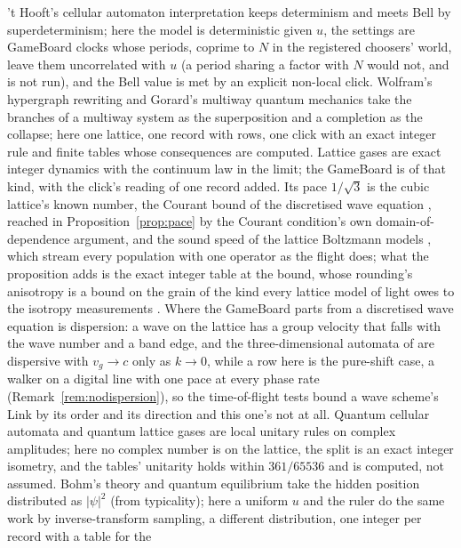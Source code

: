 \documentclass[11pt]{article}
\theoremstyle{definition}
\begin{document}
't Hooft's cellular automaton interpretation \cite{thooft2016} keeps
determinism and meets Bell by superdeterminism; here the model is
deterministic given $u$, the settings are GameBoard clocks whose
periods, coprime to $N$ in the registered choosers' world, leave them
uncorrelated with $u$ (a period sharing a factor with $N$ would not, and
is not run), and the Bell value is met by an
explicit non-local click. Wolfram's hypergraph rewriting and Gorard's
multiway quantum mechanics \cite{wolfram2020,gorard2020} take the
branches of a multiway system as the superposition and a completion as
the collapse; here one lattice, one record with rows, one click with an
exact integer rule and finite tables whose consequences are computed.
Lattice gases \cite{hpp1976,fhp1986} are exact integer dynamics with the
continuum law in the limit; the GameBoard is of that kind, with the
click's reading of one record added. Its pace $1/\sqrt3$ is the cubic
lattice's known number, the Courant bound of the discretised wave
equation \cite{cfl1928}, reached in Proposition~\ref{prop:pace} by the
Courant condition's own domain-of-dependence argument, and the sound
speed of the lattice Boltzmann models \cite{qian1992}, which stream every
population with one operator as the flight does; what the proposition
adds is the exact integer table at the bound, whose rounding's
anisotropy is a bound on the grain of the kind every lattice model of
light owes to the isotropy measurements \cite{nagel2015}. Where the
GameBoard parts from a discretised wave equation is dispersion: a wave
on the lattice has a group velocity that falls with the wave number and
a band edge, and the three-dimensional automata of
\cite{bialynicki1994,arrighi2019} are
dispersive with $v_g \to c$ only as $k \to 0$, while a row here is the
pure-shift case, a walker on a digital line with one pace at every
phase rate (Remark~\ref{rem:nodispersion}), so the time-of-flight tests
\cite{abdo2009} bound a wave scheme's Link by its order and its
direction and this one's not at all. Quantum cellular automata and
quantum lattice gases \cite{bialynicki1994,meyer1996,arrighi2019} are
local unitary rules on complex amplitudes; here no complex number is on
the lattice, the split is an exact integer isometry, and the tables'
unitarity holds within $361/65536$ and is computed, not assumed. Bohm's
theory and quantum equilibrium \cite{bohm1952,dgz1992} take the hidden
position distributed as $|\psi|^2$ (from typicality); here a uniform $u$
and the ruler do the same work by inverse-transform sampling, a
different distribution, one integer per record with a table for the
\end{document}
